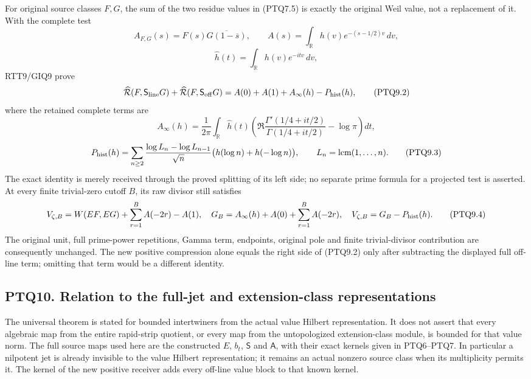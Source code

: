 For original source classes \(F,G\), the sum of the two residue values
in (PTQ7.5) is exactly the original Weil value, not a replacement of it.
With the complete test \[
A_{F,G}(s)=F(s)\overline{G(1-\overline s)},\qquad
A(s)=\int_{\mathbb R}h(v)e^{-(s-1/2)v}\,dv,
\] \[
\widehat h(t)=\int_{\mathbb R}h(v)e^{-itv}\,dv,
\tag{PTQ9.1}
\] RTT9/GIQ9 prove \[
\widehat{\mathcal R}(F,\mathsf S_{\rm line}G)
+\widehat{\mathcal R}(F,\mathsf S_{\rm off}G)
=A(0)+A(1)+A_\infty(h)-P_{\rm hist}(h),
\tag{PTQ9.2}
\] where the retained complete terms are \[
A_\infty(h)=\frac1{2\pi}\int_{\mathbb R}\widehat h(t)
\left(\Re\frac{\Gamma'(1/4+it/2)}{\Gamma(1/4+it/2)}-\log\pi\right)dt,
\] \[
P_{\rm hist}(h)=\sum_{n\ge2}\frac{\log L_n-\log L_{n-1}}{\sqrt n}
\bigl(h(\log n)+h(-\log n)\bigr),\qquad
L_n=\operatorname{lcm}(1,\ldots,n).
\tag{PTQ9.3}
\] The exact identity is merely received through the proved splitting of
its left side; no separate prime formula for a projected test is
asserted. At every finite trivial-zero cutoff \(B\), its raw divisor
still satisfies \[
V_{\zeta,B}=W(EF,EG)+\sum_{r=1}^B A(-2r)-A(1),
\quad G_B=A_\infty(h)+A(0)+\sum_{r=1}^B A(-2r),
\quad V_{\zeta,B}=G_B-P_{\rm hist}(h).
\tag{PTQ9.4}
\] The original unit, full prime-power repetitions, Gamma term,
endpoints, original pole and finite trivial-divisor contribution are
consequently unchanged. The new positive compression alone equals the
right side of (PTQ9.2) only after subtracting the displayed full
off-line term; omitting that term would be a different identity.

\subsection{PTQ10. Relation to the full-jet and extension-class
representations}\label{ptq10.-relation-to-the-full-jet-and-extension-class-representations}

The universal theorem is stated for bounded intertwiners from the actual
value Hilbert representation. It does not assert that every algebraic
map from the entire rapid-strip quotient, or every map from the
untopologized extension-class module, is bounded for that value norm.
The full source maps used here are the constructed \(E\), \(b_t\),
\(\mathsf S\) and \(\mathsf A\), with their exact kernels given in
PTQ6--PTQ7. In particular a nilpotent jet is already invisible to the
value Hilbert representation; it remains an actual nonzero source class
when its multiplicity permits it. The kernel of the new positive
receiver adds every off-line value block to that known kernel.


